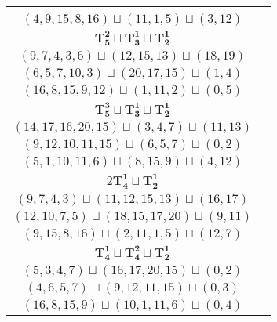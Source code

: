 \documentclass{article}
\begin{document}
\begin{longtable}{|c|c|}
\begin{tabular}{c}
        $(12,10,7,5,6)\sqcup(20,17,15)\sqcup(1,4)$ \\ 
        $(4,9,15,8,16)\sqcup(11,1,5)\sqcup(3,12)$
        \end{tabular} \\ 
        \hline
        $\mathbf{T_{5}^{2}} \sqcup \mathbf{T_{3}^{1}} \sqcup \mathbf{T_{2}^{1}}$ & \begin{tabular}{c}
        $(12,9,6,4,11)\sqcup(17,16,15)\sqcup(0,1)$ \\ 
        $(9,7,4,3,6)\sqcup(12,15,13)\sqcup(18,19)$ \\ 
        $(6,5,7,10,3)\sqcup(20,17,15)\sqcup(1,4)$ \\ 
        $(16,8,15,9,12)\sqcup(1,11,2)\sqcup(0,5)$
        \end{tabular} \\ 
        \hline
        $\mathbf{T_{5}^{3}} \sqcup \mathbf{T_{3}^{1}} \sqcup \mathbf{T_{2}^{1}}$ & \begin{tabular}{c}
        $(13,15,16,18,14)\sqcup(9,6,7)\sqcup(2,4)$ \\ 
        $(14,17,16,20,15)\sqcup(3,4,7)\sqcup(11,13)$ \\ 
        $(9,12,10,11,15)\sqcup(6,5,7)\sqcup(0,2)$ \\ 
        $(5,1,10,11,6)\sqcup(8,15,9)\sqcup(4,12)$
        \end{tabular} \\ 
        \hline
        $2\mathbf{T_{4}^{1}} \sqcup \mathbf{T_{2}^{1}}$ & \begin{tabular}{c}
        $(4,6,9,12)\sqcup(16,15,14,13)\sqcup(19,20)$ \\ 
        $(9,7,4,3)\sqcup(11,12,15,13)\sqcup(16,17)$ \\ 
        $(12,10,7,5)\sqcup(18,15,17,20)\sqcup(9,11)$ \\ 
        $(9,15,8,16)\sqcup(2,11,1,5)\sqcup(12,7)$
        \end{tabular} \\ 
        \hline
        $\mathbf{T_{4}^{1}} \sqcup \mathbf{T_{4}^{2}} \sqcup \mathbf{T_{2}^{1}}$ & \begin{tabular}{c}
        $(11,9,6,7)\sqcup(16,15,13,14)\sqcup(1,4)$ \\ 
        $(5,3,4,7)\sqcup(16,17,20,15)\sqcup(0,2)$ \\ 
        $(4,6,5,7)\sqcup(9,12,11,15)\sqcup(0,3)$ \\ 
        $(16,8,15,9)\sqcup(10,1,11,6)\sqcup(0,4)$
        \end{tabular} \\ 

\end{longtable}
\end{document}
